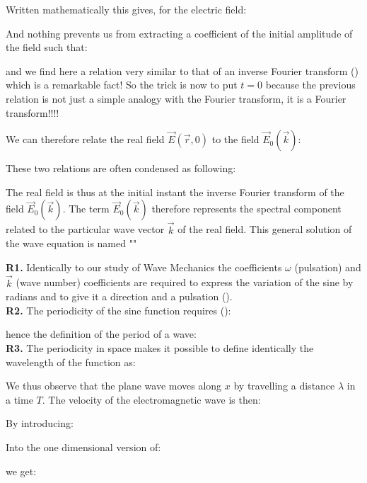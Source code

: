 	Written mathematically this gives, for the electric field:
	
	And nothing prevents us from extracting a coefficient of the initial amplitude of the field such that:
	
	and we find here a relation very similar to that of an inverse Fourier transform () which is a remarkable fact! So the trick is now to put $t=0$ because the previous relation is not just a simple analogy with the Fourier transform, it is a Fourier transform!!!!

	We can therefore relate the real field $\vec{E}(\vec{r},0)$ to the field $\vec{E}_0(\vec{k})$:
	
	These two relations are often condensed as following:
	
	The real field is thus at the initial instant the inverse Fourier transform of the field $\vec{E}_0(\vec{k})$. The term $\vec{E}_0(\vec{k})$ therefore represents the spectral component related to the particular wave vector $\vec{k}$ of the real field. This general solution of the wave equation is named ""
	\begin{tcolorbox}[title=Remarks,colframe=black,arc=10pt]
	\textbf{R1.} Identically to our study of Wave Mechanics the coefficients $\omega$ (pulsation) and $\vec{k}$ (wave number) coefficients are required to express the variation of the sine by radians and to give it a direction and a pulsation ().\\

	\textbf{R2.} The periodicity of the sine function requires ():
	
	hence the definition of the period of a wave:
	\\

	\textbf{R3.} The periodicity in space makes it possible to define identically the wavelength of the function as:
	
	We thus observe that the plane wave moves along $x$ by travelling a distance $\lambda$ in a time $T$. The velocity of the electromagnetic wave is then:
	
	\end{tcolorbox}
	By introducing:
	
	Into the one dimensional version of:
	
	we get:
	
